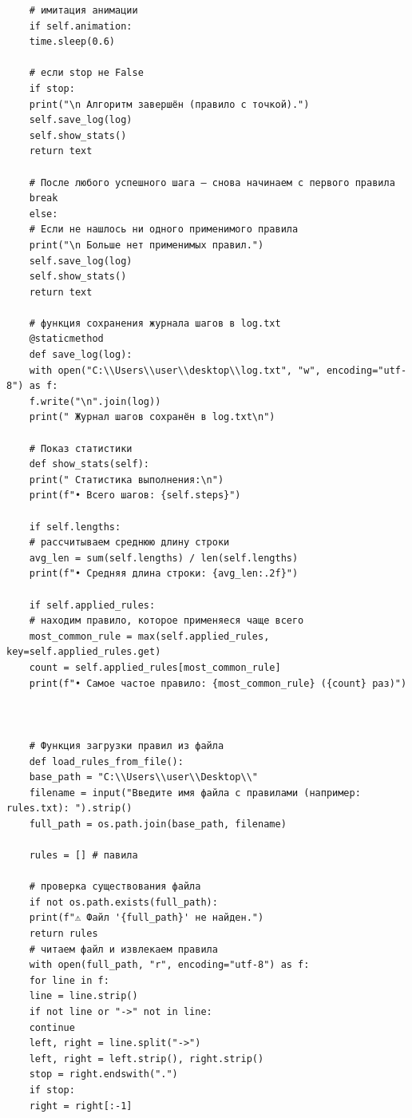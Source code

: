 \begin{lstlisting}
	# имитация анимации
	if self.animation:
	time.sleep(0.6)
	
	# если stop не False
	if stop:
	print("\n Алгоритм завершён (правило с точкой).")
	self.save_log(log)
	self.show_stats()
	return text
	
	# После любого успешного шага — снова начинаем с первого правила
	break
	else:
	# Если не нашлось ни одного применимого правила
	print("\n Больше нет применимых правил.")
	self.save_log(log)
	self.show_stats()
	return text
	
	# функция сохранения журнала шагов в log.txt
	@staticmethod
	def save_log(log):
	with open("C:\\Users\\user\\desktop\\log.txt", "w", encoding="utf-8") as f:
	f.write("\n".join(log))
	print(" Журнал шагов сохранён в log.txt\n")
	
	# Показ статистики
	def show_stats(self):
	print(" Статистика выполнения:\n")
	print(f"• Всего шагов: {self.steps}")
	
	if self.lengths:
	# рассчитываем среднюю длину строки
	avg_len = sum(self.lengths) / len(self.lengths)
	print(f"• Средняя длина строки: {avg_len:.2f}")
	
	if self.applied_rules:
	# находим правило, которое применяеся чаще всего
	most_common_rule = max(self.applied_rules, key=self.applied_rules.get)
	count = self.applied_rules[most_common_rule]
	print(f"• Самое частое правило: {most_common_rule} ({count} раз)")
	
	
	
	# Функция загрузки правил из файла
	def load_rules_from_file():
	base_path = "C:\\Users\\user\\Desktop\\"
	filename = input("Введите имя файла с правилами (например: rules.txt): ").strip()
	full_path = os.path.join(base_path, filename)
	
	rules = [] # павила
	
	# проверка существования файла
	if not os.path.exists(full_path):
	print(f"⚠️ Файл '{full_path}' не найден.")
	return rules
	# читаем файл и извлекаем правила
	with open(full_path, "r", encoding="utf-8") as f:
	for line in f:
	line = line.strip()
	if not line or "->" not in line:
	continue
	left, right = line.split("->")
	left, right = left.strip(), right.strip()
	stop = right.endswith(".")
	if stop:
	right = right[:-1]
	

\end{lstlisting}
